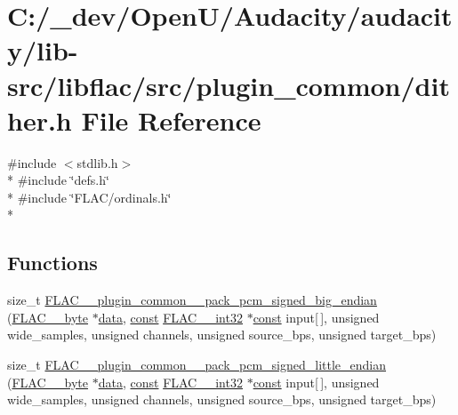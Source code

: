 \hypertarget{lib-src_2libflac_2src_2plugin__common_2dither_8h}{}\section{C\+:/\+\_\+dev/\+Open\+U/\+Audacity/audacity/lib-\/src/libflac/src/plugin\+\_\+common/dither.h File Reference}
\label{lib-src_2libflac_2src_2plugin__common_2dither_8h}
{\ttfamily \#include $<$stdlib.\+h$>$}\\*
{\ttfamily \#include \char`\"{}defs.\+h\char`\"{}}\\*
{\ttfamily \#include \char`\"{}F\+L\+A\+C/ordinals.\+h\char`\"{}}\\*
\subsection*{Functions}
\begin{DoxyCompactItemize}
\item 
size\+\_\+t \hyperlink{lib-src_2libflac_2src_2plugin__common_2dither_8h_ac0fa7911d7ab45f4389da70fd7f34c53}{F\+L\+A\+C\+\_\+\+\_\+plugin\+\_\+common\+\_\+\+\_\+pack\+\_\+pcm\+\_\+signed\+\_\+big\+\_\+endian} (\hyperlink{ordinals_8h_a5eb569b12d5b047cdacada4d57924ee3}{F\+L\+A\+C\+\_\+\+\_\+byte} $\ast$\hyperlink{lib_2expat_8h_ac39e72a1de1cb50dbdc54b08d0432a24}{data}, \hyperlink{getopt1_8c_a2c212835823e3c54a8ab6d95c652660e}{const} \hyperlink{ordinals_8h_a33fd77bfe6d685541a0c034a75deccdc}{F\+L\+A\+C\+\_\+\+\_\+int32} $\ast$\hyperlink{getopt1_8c_a2c212835823e3c54a8ab6d95c652660e}{const} input\mbox{[}$\,$\mbox{]}, unsigned wide\+\_\+samples, unsigned channels, unsigned source\+\_\+bps, unsigned target\+\_\+bps)
\item 
size\+\_\+t \hyperlink{lib-src_2libflac_2src_2plugin__common_2dither_8h_a9f7c369ff60dc6b60d0d892a3bb0721f}{F\+L\+A\+C\+\_\+\+\_\+plugin\+\_\+common\+\_\+\+\_\+pack\+\_\+pcm\+\_\+signed\+\_\+little\+\_\+endian} (\hyperlink{ordinals_8h_a5eb569b12d5b047cdacada4d57924ee3}{F\+L\+A\+C\+\_\+\+\_\+byte} $\ast$\hyperlink{lib_2expat_8h_ac39e72a1de1cb50dbdc54b08d0432a24}{data}, \hyperlink{getopt1_8c_a2c212835823e3c54a8ab6d95c652660e}{const} \hyperlink{ordinals_8h_a33fd77bfe6d685541a0c034a75deccdc}{F\+L\+A\+C\+\_\+\+\_\+int32} $\ast$\hyperlink{getopt1_8c_a2c212835823e3c54a8ab6d95c652660e}{const} input\mbox{[}$\,$\mbox{]}, unsigned wide\+\_\+samples, unsigned channels, unsigned source\+\_\+bps, unsigned target\+\_\+bps)
\end{DoxyCompactItemize}


